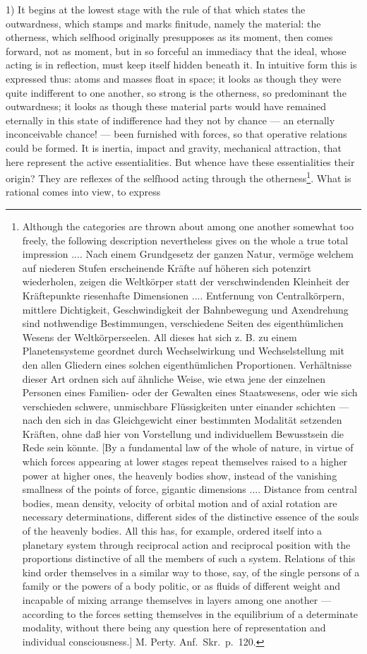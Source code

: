 \documentclass[12pt,a4paper]{book}
\begin{document}
1) It begins at the lowest stage with the rule of that which states the
outwardness, which stamps and marks finitude, namely the material: the
otherness, which selfhood originally presupposes as its moment, then comes
forward, not as moment, but in so forceful an immediacy that the ideal, whose
acting is in reflection, must keep itself hidden beneath it. In intuitive form
this is expressed thus: atoms and masses float in space; it looks as though
they were quite indifferent to one another, so strong is the otherness, so
predominant the outwardness; it looks as though these material parts would have
remained eternally in this state of indifference had they not by chance --- an
eternally inconceivable chance! --- been furnished with forces, so that
operative relations could be formed. It is inertia, impact and gravity,
mechanical attraction, that here represent the active essentialities. But
whence have these essentialities their origin? They are reflexes of the
selfhood acting through the otherness\footnote{Although the categories are
thrown about among one another somewhat too freely, the following description
nevertheless gives on the whole a true total impression .... Nach einem
Grundgesetz der ganzen Natur, vermöge welchem auf niederen Stufen
erscheinende Kräfte auf höheren sich potenzirt wiederholen, zeigen die
Weltkörper statt der verschwindenden Kleinheit der Kräftepunkte
riesenhafte Dimensionen .... Entfernung von Centralkörpern, mittlere
Dichtigkeit, Geschwindigkeit der Bahnbewegung und Axendrehung sind
nothwendige Bestimmungen, verschiedene Seiten des eigenthümlichen
Wesens der Weltkörperseelen. All dieses hat sich z. B. zu einem
Planetensysteme geordnet durch Wechselwirkung und Wechselstellung mit
den allen Gliedern eines solchen eigenthümlichen Proportionen.
Verhältnisse dieser Art ordnen sich auf ähnliche Weise, wie etwa jene
der einzelnen Personen eines Familien- oder der Gewalten eines
Staatswesens, oder wie sich verschieden schwere, unmischbare
Flüssigkeiten unter einander schichten --- nach den sich in das
Gleichgewicht einer bestimmten Modalität setzenden Kräften, ohne daß
hier von Vorstellung und individuellem Bewusstsein die Rede sein könnte.
[By a fundamental law of the whole of nature, in virtue of which forces
appearing at lower stages repeat themselves raised to a higher power at higher
ones, the heavenly bodies show, instead of the vanishing smallness of the
points of force, gigantic dimensions .... Distance from central bodies, mean
density, velocity of orbital motion and of axial rotation are necessary
determinations, different sides of the distinctive essence of the souls of the
heavenly bodies. All this has, for example, ordered itself into a planetary
system through reciprocal action and reciprocal position with the proportions
distinctive of all the members of such a system. Relations of this kind order
themselves in a similar way to those, say, of the single persons of a family or
the powers of a body politic, or as fluids of different weight and incapable of
mixing arrange themselves in layers among one another --- according to the
forces setting themselves in the equilibrium of a determinate modality, without
there being any question here of representation and individual consciousness.]
M. Perty. Anf.\ Skr.\ p.~120.}. What is rational comes into view, to express
\end{document}
